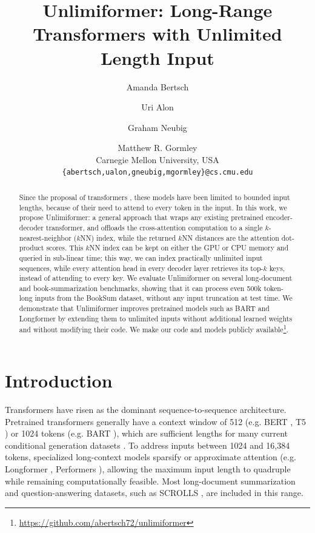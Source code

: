 \documentclass{article}
\title{Unlimiformer: Long-Range Transformers with Unlimited Length Input}
\author{Amanda Bertsch \and Uri Alon \and Graham Neubig \and Matthew R. Gormley
 \\
        Carnegie Mellon University, USA \\
        \texttt{\{abertsch,ualon,gneubig,mgormley\}@cs.cmu.edu}}
\newcommand{\ours}{Unlimiformer\xspace}
\begin{document}
\maketitle
\begin{abstract}
Since the proposal of transformers \citep{vaswani-attn}, these models have been limited to bounded input lengths, because of their need to attend to every token in the input.
In this work, we propose \ours{}: a general approach that wraps any existing pretrained encoder-decoder transformer, and offloads the cross-attention computation 
to a single $k$-nearest-neighbor ($k$NN) index, while the returned $k$NN distances are the attention dot-product scores.
This $k$NN index can be kept on either the GPU or CPU memory and queried in sub-linear time;
this way, we can index practically unlimited input sequences, while every attention head in every decoder layer retrieves its top-$k$ keys, instead of attending to every key. 
We 
evaluate \ours
on several long-document and book-summarization benchmarks, showing that it can %
process even 500k token-long inputs from the BookSum dataset, without any input truncation at test time. We demonstrate that \ours improves pretrained models such as BART \citep{lewis2020bart} and Longformer \citep{beltagy2020longformer} by extending them to unlimited inputs without additional learned weights and without modifying their code. 
We make our code and models publicly available\footnote{\url{https://github.com/abertsch72/unlimiformer}}.

\end{abstract}

\section{Introduction}






Transformers \citep{vaswani-attn} have risen as the dominant sequence-to-sequence architecture. %
Pretrained transformers 
generally have a context window of 512 (e.g. BERT \citep{devlin-etal-2019-bert}, T5 \citep{raffel2020exploring}) or 1024 tokens (e.g. BART \citep{lewis-etal-2020-bart}), 
which are sufficient lengths for many current conditional generation datasets \citep[XSum; ][]{narayan-etal-2018-dont} \citep[CNN/DM; ][]{nallapati-etal-2016-abstractive}. 
To address inputs between 1024 and 16,384 tokens, specialized long-context models sparsify or approximate attention (e.g. Longformer \citep{beltagy2020longformer}, Performers \citep{performers}), allowing the maximum input length to quadruple while remaining computationally feasible. 
Most long-document summarization and question-answering datasets, such as 
SCROLLS \citep{scrolls}, are included in this range.
\end{document}
